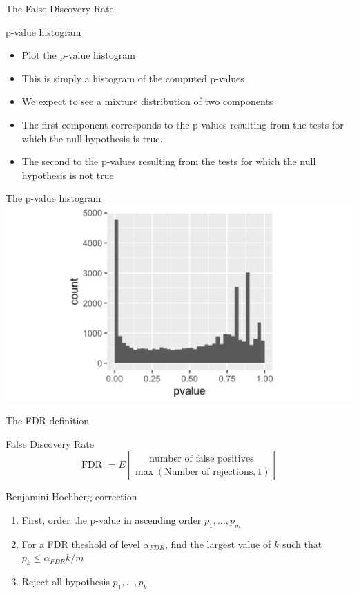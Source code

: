 \documentclass{bredelebeamer}
\begin{document}
\begin{frame}{The False Discovery Rate }
\begin{block}{p-value histogram}
\begin{itemize}
\item Plot the p-value histogram
\item This is simply a histogram of the computed p-values
\item We expect to see a mixture distribution of two components
\item The first component corresponds to the p-values resulting from the tests for which the null hypothesis is true.
\item The second to the p-values resulting from the tests for which the null hypothesis is not true
\end{itemize}

\end{block}
\end{frame}
\begin{frame}{The p-value histogram}
\includegraphics[width=1\textwidth]{pvaluehist}
\end{frame}
\begin{frame}{The FDR definition}
\begin{block}{False Discovery Rate}
\begin{equation}
	\text{FDR } = E\left[\frac{\text{number of false positives}}{\max(\text{Number of rejections},1)} \right]
\end{equation}
\end{block}{Benjamini-Hochberg correction}
\begin{enumerate}
\item First, order the p-value in ascending order $p_1,..., p_m$
\item For a FDR theshold of level $\alpha_{FDR}$, find the largest value of $k$ such that $p_k \leq \alpha_{FDR} k /m$
\item Reject all hypothesis $p_1,...,p_k$
\end{enumerate}
\end{frame}
\end{document}
